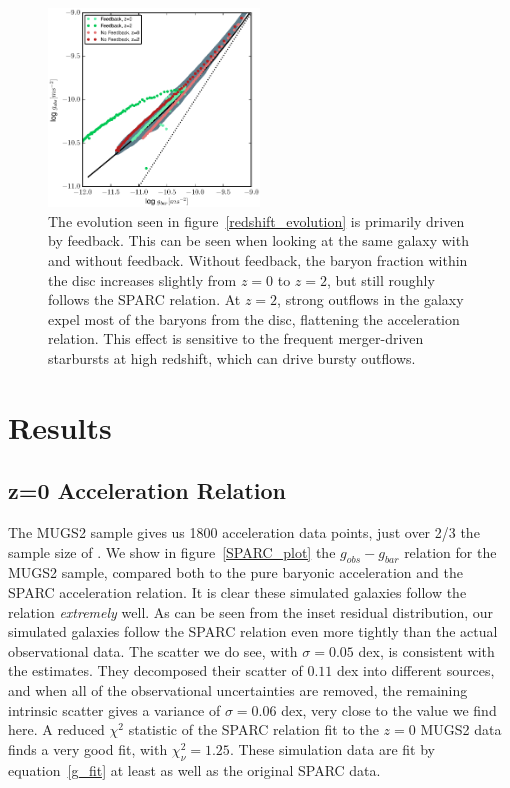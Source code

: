 \begin{figure}
    \includegraphics[width=0.5\textwidth]{figures4/FB_effects.eps}
    \caption{The evolution seen in figure~\ref{redshift_evolution} is primarily
    driven by feedback.  This can be seen when looking at the same galaxy with
    and without feedback.  Without feedback, the baryon fraction within the disc
    increases slightly from $z=0$ to $z=2$, but still roughly follows the SPARC
    relation.  At $z=2$, strong outflows in the galaxy expel most of the baryons
    from the disc, flattening the acceleration relation.  This effect is
    sensitive to the frequent merger-driven starbursts at high redshift, which
    can drive bursty outflows.}
    \label{FB_effects}
\end{figure}
\section{Results}
\subsection{z=0 Acceleration Relation}
The MUGS2 sample gives us 1800 acceleration data points, just over 2/3 the
sample size of \citet{McGaugh2016}. We show in figure~\ref{SPARC_plot} the
$g_{obs}-g_{bar}$ relation for the MUGS2 sample, compared both to the pure
baryonic acceleration and the SPARC acceleration relation.  It is clear these
simulated galaxies follow the \citet{McGaugh2016} relation {\it extremely} well.
As can be seen from the inset residual distribution, our simulated galaxies
follow the SPARC relation even more tightly than the actual observational data.
The scatter we do see, with $\sigma=0.05$ dex, is consistent with the
\citet{McGaugh2016} estimates.  They decomposed their scatter of $0.11$
dex into different sources, and when all of the observational uncertainties are
removed, the remaining intrinsic scatter gives a variance of $\sigma=0.06$ dex,
very close to the value we find here.  A reduced $\chi^2$ statistic of the SPARC
relation fit to the $z=0$ MUGS2 data finds a very good fit, with $\chi^2_\nu =
1.25$.  These simulation data are fit by equation~\ref{g_fit} at least as well
as the original SPARC data.

